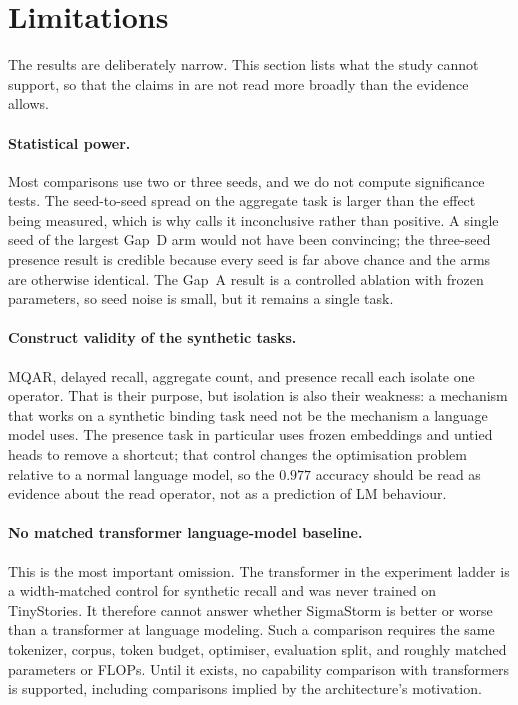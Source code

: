 \section{Limitations}
\label{sec:limitations}

The results are deliberately narrow. This section lists what the study cannot support, so that
the claims in  are not read more broadly than the evidence allows.

\paragraph{Statistical power.}
Most comparisons use two or three seeds, and we do not compute significance tests. The
seed-to-seed spread on the aggregate task is larger than the effect being measured, which is
why  calls it inconclusive rather than positive. A single seed of the
largest Gap~D arm would not have been convincing; the three-seed presence result is credible
because every seed is far above chance and the arms are otherwise identical. The Gap~A result
is a controlled ablation with frozen parameters, so seed noise is small, but it remains a
single task.

\paragraph{Construct validity of the synthetic tasks.}
MQAR, delayed recall, aggregate count, and presence recall each isolate one operator. That is
their purpose, but isolation is also their weakness: a mechanism that works on a synthetic
binding task need not be the mechanism a language model uses. The presence task in particular
uses frozen embeddings and untied heads to remove a shortcut; that control changes the
optimisation problem relative to a normal language model, so the $0.977$ accuracy should be
read as evidence about the read operator, not as a prediction of LM behaviour.

\paragraph{No matched transformer language-model baseline.}
This is the most important omission. The transformer in the experiment ladder is a width-matched
control for synthetic recall and was never trained on TinyStories. It therefore cannot answer
whether SigmaStorm is better or worse than a transformer at language modeling. Such a comparison
requires the same tokenizer, corpus, token budget, optimiser, evaluation split, and roughly
matched parameters or FLOPs. Until it exists, no capability comparison with transformers is
supported, including comparisons implied by the architecture's motivation.

